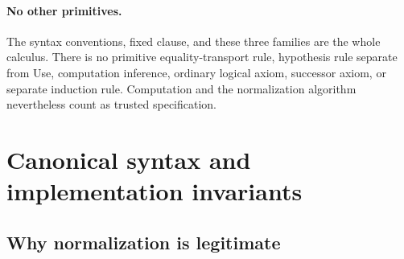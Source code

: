 \documentclass[11pt,letterpaper]{article}
\theoremstyle{definition}\newtheorem{definition}[theorem]{Definition}
\theoremstyle{remark}\newtheorem{remark}[theorem]{Remark}
\begin{document}
\paragraph{No other primitives.}
The syntax conventions, fixed clause, and these three families are the
whole calculus. There is no primitive equality-transport rule, hypothesis
rule separate from Use, computation inference, ordinary logical axiom,
successor axiom, or separate induction rule. Computation and the
normalization algorithm nevertheless count as trusted specification.

\section{Canonical syntax and implementation invariants}\label{sec:norm}

\subsection{Why normalization is legitimate}
\end{document}

